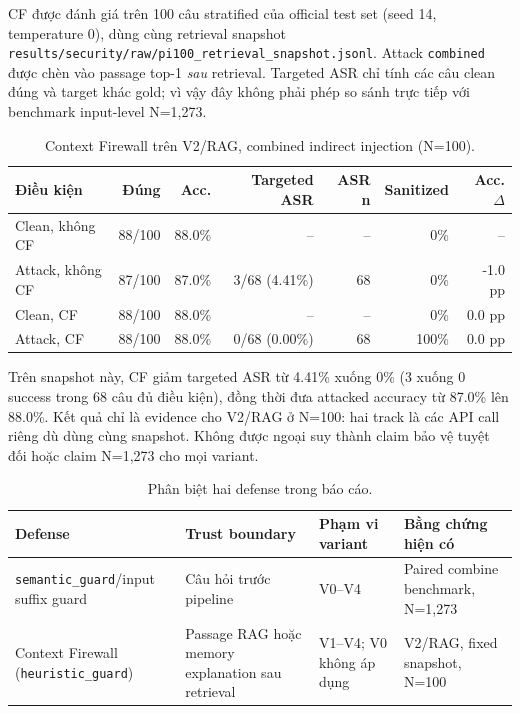 CF được đánh giá trên 100 câu stratified của official test set (seed 14,
temperature 0), dùng cùng retrieval snapshot
\texttt{results/security/raw/pi100\_retrieval\_snapshot.jsonl}. Attack
\texttt{combined} được chèn vào passage top-1 \emph{sau} retrieval. Targeted
ASR chỉ tính các câu clean đúng và target khác gold; vì vậy đây không phải
phép so sánh trực tiếp với benchmark input-level N=1,273.

\begin{table}[H]
\centering
\small
\caption{Context Firewall trên V2/RAG, combined indirect injection (N=100).}
\label{tab:context_firewall_results}
\begin{tabular}{lrrrrrr}
\toprule
\textbf{Điều kiện} & \textbf{Đúng} & \textbf{Acc.} &
\textbf{Targeted ASR} & \textbf{ASR n} & \textbf{Sanitized} & \textbf{Acc. $\Delta$} \\
\midrule
Clean, không CF  & 88/100 & 88.0\% & --             & -- & 0\%   & -- \\
Attack, không CF & 87/100 & 87.0\% & 3/68 (4.41\%) & 68 & 0\%   & -1.0 pp \\
Clean, CF        & 88/100 & 88.0\% & --             & -- & 0\%   & 0.0 pp \\
Attack, CF       & 88/100 & 88.0\% & 0/68 (0.00\%) & 68 & 100\% & 0.0 pp \\
\bottomrule
\end{tabular}
\end{table}

Trên snapshot này, CF giảm targeted ASR từ 4.41\% xuống 0\% (3 xuống 0
success trong 68 câu đủ điều kiện), đồng thời đưa attacked accuracy từ
87.0\% lên 88.0\%. Kết quả chỉ là evidence cho V2/RAG ở N=100: hai track
là các API call riêng dù dùng cùng snapshot. Không được ngoại suy thành
claim bảo vệ tuyệt đối hoặc claim N=1,273 cho mọi variant.

\begin{table}[H]
\centering
\small
\caption{Phân biệt hai defense trong báo cáo.}
\label{tab:defense_scope_comparison}
\begin{tabular}{p{3.0cm}p{3.3cm}p{3.6cm}p{3.2cm}}
\toprule
\textbf{Defense} & \textbf{Trust boundary} & \textbf{Phạm vi variant} & \textbf{Bằng chứng hiện có} \\
\midrule
\texttt{semantic\_guard}/input suffix guard & Câu hỏi trước pipeline & V0--V4 & Paired combine benchmark, N=1,273 \\
Context Firewall (\texttt{heuristic\_guard}) & Passage RAG hoặc memory explanation sau retrieval & V1--V4; V0 không áp dụng & V2/RAG, fixed snapshot, N=100 \\
\bottomrule
\end{tabular}
\end{table}

